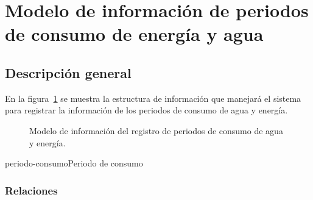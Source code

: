
\section{Modelo de información de periodos de consumo de energía y agua}

\subsection{Descripción general}
 En la figura~\ref{fig:registroInfoBasePeriodo} se muestra la estructura de información que manejará el sistema para registrar la información de los periodos de consumo de agua y energía.
 
\begin{figure}[htbp!]
	\begin{center}
		\caption{Modelo de información del registro de periodos de consumo de agua y energía.}
		\label{fig:registroInfoBasePeriodo}
	\end{center}
\end{figure}

\begin{BusinessEntity}{periodo-consumo}{Periodo de consumo}
\end{BusinessEntity}

\subsubsection{Relaciones}

